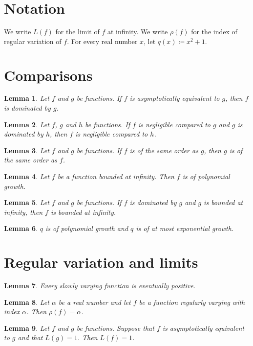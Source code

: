 \documentclass{article}
\newtheorem{lemma}{Lemma}
\begin{document}
\section{Notation}

We write $L(f)$ for the limit of $f$ at infinity.
We write $\rho(f)$ for the index of regular variation of $f$.
For every real number $x$, let $q(x)\coloneqq x^2+1$.

\section{Comparisons}

\begin{lemma}\label{equivalent}
Let $f$ and $g$ be functions. If $f$ is asymptotically equivalent to $g$, then $f$ is dominated by $g$.
\end{lemma}

\begin{lemma}\label{negligible}
Let $f$, $g$ and $h$ be functions. If $f$ is negligible compared to $g$ and $g$ is dominated by $h$, then $f$ is negligible compared to $h$.
\end{lemma}

\begin{lemma}\label{order}
Let $f$ and $g$ be functions. If $f$ is of the same order as $g$, then $g$ is of the same order as $f$.
\end{lemma}

\begin{lemma}\label{bounded}
Let $f$ be a function bounded at infinity. Then $f$ is of polynomial growth.
\end{lemma}

\begin{lemma}\label{dominated}
Let $f$ and $g$ be functions. If $f$ is dominated by $g$ and $g$ is bounded at infinity, then $f$ is bounded at infinity.
\end{lemma}

\begin{lemma}\label{polynomial}
$q$ is of polynomial growth and $q$ is of at most exponential growth.
\end{lemma}

\section{Regular variation and limits}

\begin{lemma}\label{slow}
Every slowly varying function is eventually positive.
\end{lemma}

\begin{lemma}\label{regular}
Let $\alpha$ be a real number and let $f$ be a function regularly varying with index $\alpha$. Then $\rho(f)=\alpha$.
\end{lemma}

\begin{lemma}\label{limit}
Let $f$ and $g$ be functions. Suppose that $f$ is asymptotically equivalent to $g$ and that $L(g)=1$. Then $L(f)=1$.
\end{lemma}
\end{document}
